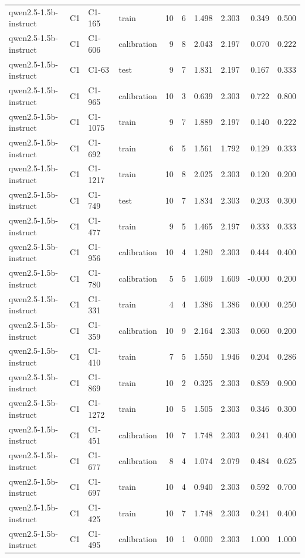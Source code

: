 \begin{table}
\begin{tabular}{llllrrrrrr}
qwen2.5-1.5b-instruct & C1 & C1-165 & train & 10 & 6 & 1.498 & 2.303 & 0.349 & 0.500 \\
qwen2.5-1.5b-instruct & C1 & C1-606 & calibration & 9 & 8 & 2.043 & 2.197 & 0.070 & 0.222 \\
qwen2.5-1.5b-instruct & C1 & C1-63 & test & 9 & 7 & 1.831 & 2.197 & 0.167 & 0.333 \\
qwen2.5-1.5b-instruct & C1 & C1-965 & calibration & 10 & 3 & 0.639 & 2.303 & 0.722 & 0.800 \\
qwen2.5-1.5b-instruct & C1 & C1-1075 & train & 9 & 7 & 1.889 & 2.197 & 0.140 & 0.222 \\
qwen2.5-1.5b-instruct & C1 & C1-692 & train & 6 & 5 & 1.561 & 1.792 & 0.129 & 0.333 \\
qwen2.5-1.5b-instruct & C1 & C1-1217 & train & 10 & 8 & 2.025 & 2.303 & 0.120 & 0.200 \\
qwen2.5-1.5b-instruct & C1 & C1-749 & test & 10 & 7 & 1.834 & 2.303 & 0.203 & 0.300 \\
qwen2.5-1.5b-instruct & C1 & C1-477 & train & 9 & 5 & 1.465 & 2.197 & 0.333 & 0.333 \\
qwen2.5-1.5b-instruct & C1 & C1-956 & calibration & 10 & 4 & 1.280 & 2.303 & 0.444 & 0.400 \\
qwen2.5-1.5b-instruct & C1 & C1-780 & calibration & 5 & 5 & 1.609 & 1.609 & -0.000 & 0.200 \\
qwen2.5-1.5b-instruct & C1 & C1-331 & train & 4 & 4 & 1.386 & 1.386 & 0.000 & 0.250 \\
qwen2.5-1.5b-instruct & C1 & C1-359 & calibration & 10 & 9 & 2.164 & 2.303 & 0.060 & 0.200 \\
qwen2.5-1.5b-instruct & C1 & C1-410 & train & 7 & 5 & 1.550 & 1.946 & 0.204 & 0.286 \\
qwen2.5-1.5b-instruct & C1 & C1-869 & train & 10 & 2 & 0.325 & 2.303 & 0.859 & 0.900 \\
qwen2.5-1.5b-instruct & C1 & C1-1272 & train & 10 & 5 & 1.505 & 2.303 & 0.346 & 0.300 \\
qwen2.5-1.5b-instruct & C1 & C1-451 & calibration & 10 & 7 & 1.748 & 2.303 & 0.241 & 0.400 \\
qwen2.5-1.5b-instruct & C1 & C1-677 & calibration & 8 & 4 & 1.074 & 2.079 & 0.484 & 0.625 \\
qwen2.5-1.5b-instruct & C1 & C1-697 & train & 10 & 4 & 0.940 & 2.303 & 0.592 & 0.700 \\
qwen2.5-1.5b-instruct & C1 & C1-425 & train & 10 & 7 & 1.748 & 2.303 & 0.241 & 0.400 \\
qwen2.5-1.5b-instruct & C1 & C1-495 & calibration & 10 & 1 & 0.000 & 2.303 & 1.000 & 1.000 \\

\end{tabular}
\end{table}
